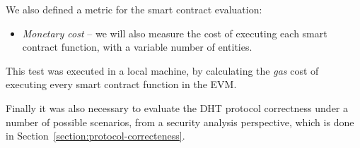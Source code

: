 \begin{table}[h!]
\centering
{}
\caption{Test scenarios.}
\label{table:test-scenarios}
\end{table}

We also defined a metric for the smart contract evaluation:

\begin{itemize}
  \item \textit{Monetary cost} – we will also measure the cost of executing each smart contract function, with a variable number of entities.
\end{itemize}

This test was executed in a local machine, by calculating the \textit{gas} cost of executing every smart contract function in the \ac{EVM}.

Finally it was also necessary to evaluate the DHT protocol correctness under a number of possible scenarios, from a security analysis perspective, which is done in Section~\ref{section:protocol-correcteness}.


